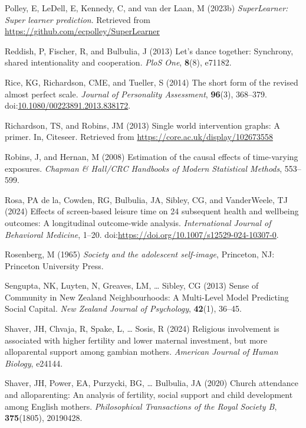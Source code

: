 \documentclass[
  single column]{article}
\newlength{\cslhangindent}
\newenvironment{CSLReferences}[2] %
 {\begin{list}{}{%
  \setlength{\itemindent}{0pt}
  \setlength{\leftmargin}{0pt}
  \setlength{\parsep}{0pt}
  \ifodd #1
   \setlength{\leftmargin}{\cslhangindent}
   \setlength{\itemindent}{-1\cslhangindent}
  \fi
  \setlength{\itemsep}{#2\baselineskip}}}
 {\end{list}}
\begin{document}
\begin{CSLReferences}{1}{0}
Polley, E, LeDell, E, Kennedy, C, and van der Laan, M (2023b)
\emph{SuperLearner: Super learner prediction}. Retrieved from
\url{https://github.com/ecpolley/SuperLearner}

Reddish, P, Fischer, R, and Bulbulia, J (2013) Let's dance together:
Synchrony, shared intentionality and cooperation. \emph{PloS One},
\textbf{8}(8), e71182.

Rice, KG, Richardson, CME, and Tueller, S (2014) The short form of the
revised almost perfect scale. \emph{Journal of Personality Assessment},
\textbf{96}(3), 368--379.
doi:\href{https://doi.org/10.1080/00223891.2013.838172}{10.1080/00223891.2013.838172}.

Richardson, TS, and Robins, JM (2013) Single world intervention graphs:
A primer. In, Citeseer. Retrieved from
\url{https://core.ac.uk/display/102673558}

Robins, J, and Hernan, M (2008) Estimation of the causal effects of
time-varying exposures. \emph{Chapman \& Hall/CRC Handbooks of Modern
Statistical Methods}, 553--599.

Rosa, PA de la, Cowden, RG, Bulbulia, JA, Sibley, CG, and VanderWeele,
TJ (2024) Effects of screen-based leisure time on 24 subsequent health
and wellbeing outcomes: A longitudinal outcome-wide analysis.
\emph{International Journal of Behavioral Medicine}, 1--20.
doi:\url{https://doi.org/10.1007/s12529-024-10307-0}.

Rosenberg, M (1965) \emph{Society and the adolescent self-image},
Princeton, NJ: Princeton University Press.

Sengupta, NK, Luyten, N, Greaves, LM, \ldots{} Sibley, CG (2013) Sense
of Community in {N}ew {Z}ealand Neighbourhoods: A Multi-Level Model
Predicting Social Capital. \emph{New Zealand Journal of Psychology},
\textbf{42}(1), 36--45.

Shaver, JH, Chvaja, R, Spake, L, \ldots{} Sosis, R (2024) Religious
involvement is associated with higher fertility and lower maternal
investment, but more alloparental support among gambian mothers.
\emph{American Journal of Human Biology}, e24144.

Shaver, JH, Power, EA, Purzycki, BG, \ldots{} Bulbulia, JA (2020) Church
attendance and alloparenting: An analysis of fertility, social support
and child development among {E}nglish mothers. \emph{Philosophical
Transactions of the Royal Society B}, \textbf{375}(1805), 20190428.


\end{CSLReferences}
\end{document}
